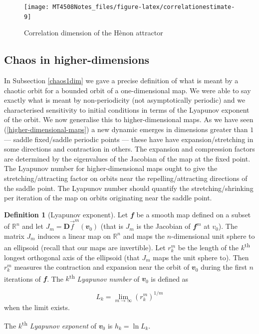 \documentclass[
  a4paper,
  oneside,
  final]{krantz}
\newcommand{\R}{\mathbb{R}}
\renewcommand{\v}[1]{{\mathbfit{#1}}}
\newcommand{\jacob}{{\mathbf{D}}\vec{f}}
\theoremstyle{definition}
\newtheorem{definition}{Definition}[chapter]
\theoremstyle{definition}
\theoremstyle{definition}
\theoremstyle{definition}
\theoremstyle{remark}
\begin{document}
\begin{figure}

{\centering \texttt{[image: MT4508Notes\_files/figure-latex/correlationestimate-9]} 

}

\caption{Correlation dimension of the Hènon attractor}\label{fig:correlationestimate}
\end{figure}

\hypertarget{chaosndim}{%
\subsection{Chaos in higher-dimensions}\label{chaosndim}}

In Subsection \ref{chaos1dim} we gave a precise definition of what is meant by a chaotic orbit for a bounded orbit of a one-dimensional map. We were able to say exactly what is meant by non-periodicity (not asymptotically periodic) and we characterised sensitivity to initial conditions in terms of the Lyapunov exponent of the orbit. We now generalise this to higher-dimensional maps. As we have seen (\ref{higher-dimensional-maps}) a new dynamic emerges in dimensions greater than \(1\) --- saddle fixed/saddle periodic points --- these have have expansion/stretching in some directions and contraction in others. The expansion and compression factors are determined by the eigenvalues of the Jacobian of the map at the fixed point. The Lyapunov number for higher-dimensional maps ought to give the stretching/attracting factor on orbits near the repelling/attracting directions of the saddle point. The Lyapunov number should quantify the stretching/shrinking per iteration of the map on orbits originating near the saddle point.

\begin{definition}[Lyapunov exponent]
\protect\hypertarget{def:lyapunovexponentndim}{}\label{def:lyapunovexponentndim}Let \(\v{f}\) be a smooth map defined on a subset of \(\R^{n}\) and let \(J_{m} = \jacob^{m}(\v{v}_{0})\) (that is \(J_{m}\) is the Jacobian of \(\v{f}^{m}\) at \(v_0\)). The matrix \(J_m\) induces a linear map on \(\R^{n}\) and maps the \(n\)-dimensional unit sphere to an ellipsoid (recall that our maps are invertible). Let \(r_{k}^{m}\) be the length of the \(k\)\textsuperscript{th} longest orthogonal axis of the ellipsoid (that \(J_m\) maps the unit sphere to). Then \(r^{m}_{k}\) measures the contraction and expansion near the orbit of \(\v{v}_{0}\) during the first \(n\) iterations of \(\v{f}\). The \(k\)\textsuperscript{th} \emph{Lyapunov number} of \(\v{v}_{0}\) is defined as

\[ L_{k} = \lim_{m \to \infty} (r_{k}^{m})^{1/m}\] when the limit exists.

The \(k\)\textsuperscript{th} \emph{Lyapunov exponent} of \(\v{v}_{0}\) is \(h_{k} = \ln L_{k}\).
\end{definition}
\end{document}
